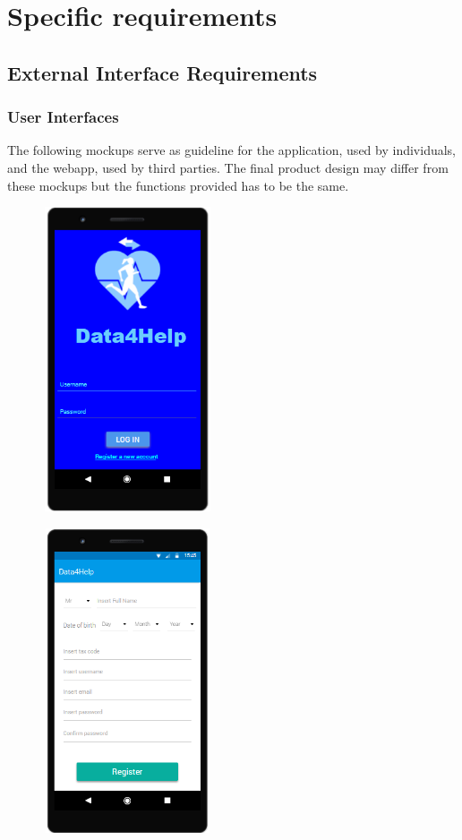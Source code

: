\chapter{Specific requirements}

\section{External Interface Requirements}
\subsection{User Interfaces}
The following mockups serve as guideline for the application, used by individuals, and the webapp, used by third parties. The final product design may differ from these mockups but the functions provided has to be the same.


\begin{figure}[H]
\centering
\begin{minipage}{.5\textwidth}
  \centering
  \includegraphics[width=5cm,height=9cm]{resources/Screen/Individuallogin.png}
  \label{fig:App Login}
\end{minipage}%
\begin{minipage}{.5\textwidth}
  \centering
  \includegraphics[width=5cm,height=9cm]{resources/Screen/RegistrationIndividual.png}
  \label{fig:App Registration}
\end{minipage}
\end{figure}


